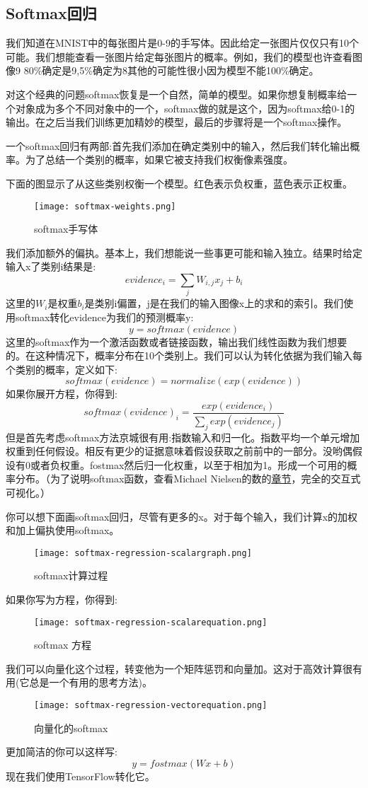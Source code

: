 \subsection{Softmax回归}
我们知道在MNIST中的每张图片是0-9的手写体。因此给定一张图片仅仅只有10个可能。我们想能查看一张图片给定每张图片的概率。例如，我们的模型也许查看图像9 80\%确定是9,5\%确定为8其他的可能性很小因为模型不能100\%确定。

对这个经典的问题softmax恢复是一个自然，简单的模型。如果你想复制概率给一个对象成为多个不同对象中的一个，softmax做的就是这个，因为softmax给0-1的输出。在之后当我们训练更加精妙的模型，最后的步骤将是一个softmax操作。

一个softmax回归有两部:首先我们添加在确定类别中的输入，然后我们转化输出概率。为了总结一个类别的概率，如果它被支持我们权衡像素强度。

下面的图显示了从这些类别权衡一个模型。红色表示负权重，蓝色表示正权重。

\begin{figure}[H]
\centering
\texttt{[image: softmax-weights.png]}
\caption{softmax手写体}
\end{figure}
我们添加额外的偏执。基本上，我们想能说一些事更可能和输入独立。结果时给定输入x了类别i结果是:
\[evidence_i = \sum_{j}W_{i,j}x_j+b_i\]
这里的$W_i$是权重$b_i$是类别i偏置，j是在我们的输入图像x上的求和的索引。我们使用softmax转化evidence为我们的预测概率y:
\[y=softmax(evidence)\]
这里的softmax作为一个激活函数或者链接函数，输出我们线性函数为我们想要的。在这种情况下，概率分布在10个类别上。我们可以认为转化依据为我们输入每个类别的概率，定义如下:
\[softmax(evidence)=normalize(exp(evidence))\]
如果你展开方程，你得到:
\[softmax(evidence)_i = \frac{exp(evidence_i)}{\sum_jexp(evidence_j)}\]
但是首先考虑softmax方法京城很有用:指数输入和归一化。指数平均一个单元增加权重到任何假设。相反有更少的证据意味着假设获取之前前中的一部分。没哟偶假设有0或者负权重。fostmax然后归一化权重，以至于相加为1。形成一个可用的概率分布。（为了说明softmax函数，查看Michael Nielsen的数的\href{http://neuralnetworksanddeeplearning.com/chap3.html#softmax}{章节}，完全的交互式可视化。）

你可以想下面画softmax回归，尽管有更多的x。对于每个输入，我们计算x的加权和加上偏执使用softmax。
\begin{figure}[H]
\centering
\texttt{[image: softmax-regression-scalargraph.png]}
\caption{softmax计算过程}
\end{figure}
如果你写为方程，你得到:
\begin{figure}[H]
\centering
\texttt{[image: softmax-regression-scalarequation.png]}
\caption{softmax 方程}
\end{figure}
我们可以向量化这个过程，转变他为一个矩阵惩罚和向量加。这对于高效计算很有用(它总是一个有用的思考方法)。
\begin{figure}[H]
\centering
\texttt{[image: softmax-regression-vectorequation.png]}
\caption{向量化的softmax}
\end{figure}
更加简洁的你可以这样写:
\[y=fostmax(Wx+b)\]
现在我们使用TensorFlow转化它。
